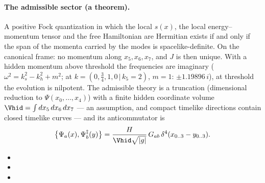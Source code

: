 \paragraph{The admissible sector (a theorem).} A positive Fock quantization in which the local
$s(x)$, the local energy--momentum tensor and the free Hamiltonian are Hermitian exists if and only if
the span of the momenta carried by the modes is spacelike-definite. On the canonical frame: no momentum
along $x_5,x_6,x_7$, and $J$ is then unique. With a hidden momentum above threshold the frequencies are
imaginary ($\omega^2=k_s^2-k_h^2+m^2$; at $k=(0,\tfrac34,1,0\,|\,k_5=2)$, $m=1$: $\pm1.19896\,i$), at
threshold the evolution is nilpotent. The admissible theory is a truncation (dimensional reduction to
$\Psi(x_0,\dots,x_4)$) with a finite hidden coordinate volume $\Vhid=\int dx_5\,dx_6\,dx_7$ --- an
assumption, and compact timelike directions contain closed timelike curves --- and its anticommutator
is
\[
  \bigl\{\Psi_a(x),\Psi^{\ddagger}_b(y)\bigr\}=\frac{H}{\Vhid\sqrt{|g|}}\,G_{ab}\,\delta^4(x_{0..3}-y_{0..3}) .
\]
\begin{itemize}
  \item {}
  \item {}
  \item {}
\end{itemize}

